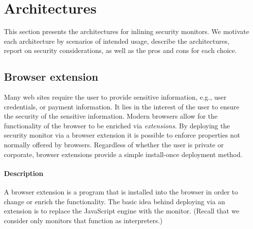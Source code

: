 \documentclass{llncs}
\begin{document}


\vspace{-.4cm} 
\section{Architectures}
\label{sec:arch}
\vspace{-.2cm}
This section presents the architectures for inlining
security monitors. We motivate each architecture by scenarios of
intended usage, describe the architectures, report on
security considerations, as well as the pros and cons for each choice.



\vspace{-.4cm}
\subsection{Browser extension}\label{sec:arch:ext}
\vspace{-.2cm}
Many web sites require the user to provide sensitive information, e.g., user
credentials, or payment information. It lies in the interest of the user to
ensure the security of the sensitive information.  Modern browsers allow for
the functionality of the browser to be enriched via \emph{extensions}. By
deploying the security monitor via a browser extension it is possible to enforce
properties not normally offered by browsers.  Regardless of whether the user is
private or corporate, browser extensions provide a simple 
install-once deployment method.

\vspace{-.4cm}
\paragraph{Description}

A browser extension is a program that is installed into the browser in order to
change or enrich the functionality.  The basic idea behind
deploying via an extension is to replace the JavaScript engine with the monitor.
(Recall that we consider only monitors that function as interpreters.)
\end{document}
